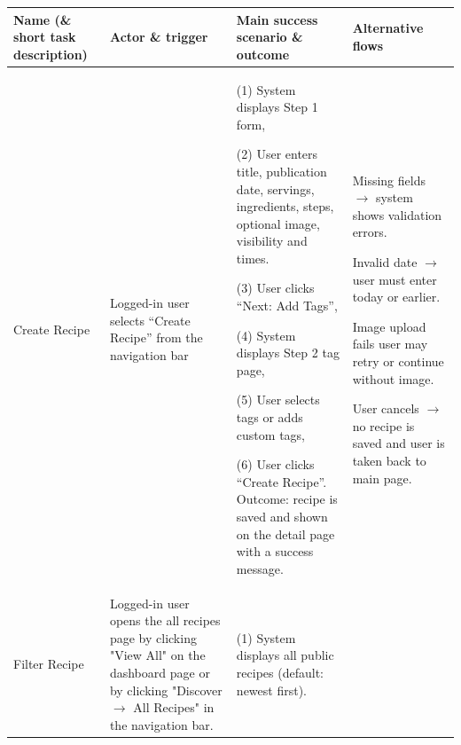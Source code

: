 \documentclass[10pt,a4paper]{article}
\begin{document}
\begin{longtable}{|p{30mm}|p{30mm}|p{40mm}|p{40mm}|}
\hline
\textbf{Name (\& short task description)}
&
\textbf{Actor \& trigger}
&
\textbf{Main success scenario \& outcome}
&
\textbf{Alternative flows}\\




\hline
Create Recipe
&
Logged-in user selects ``Create Recipe'' from the navigation bar
&
(1) System displays Step 1 form,

\vspace{1 mm}

(2) User enters title, publication date, servings, ingredients, steps, optional image, visibility and times.

\vspace{1 mm}

(3) User clicks ``Next: Add Tags'',

\vspace{1 mm}

(4) System displays Step 2 tag page,

\vspace{1 mm}

(5) User selects tags or adds custom tags,

\vspace{1 mm}

(6) User clicks ``Create Recipe''.
Outcome: recipe is saved and shown on the detail page with a success message.
&
Missing fields $\rightarrow$ system shows validation errors.

\vspace{1 mm}

Invalid date $\rightarrow$  user must enter today or earlier.

\vspace{1 mm}

Image upload fails user may retry or continue without image.

\vspace{1 mm}

User cancels $\rightarrow$  no recipe is saved and user is taken back to main page. \\
\hline




\hline
Filter Recipe
&
Logged-in user opens the all recipes page by clicking "View All" on the dashboard page
or by clicking "Discover $\rightarrow$ All Recipes" in the navigation bar.
&
(1) System displays all public recipes (default: newest first).


\end{longtable}
\end{document}
